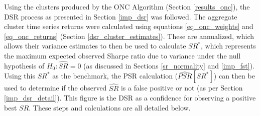 \documentclass[a4paper,11pt,oneside]{article}
\theoremstyle{plain}
\theoremstyle{definition}
\begin{document}
	Using the clusters produced by the ONC Algorithm (Section \ref{results_onc}), the DSR process as presented in Section \ref{imp_dsr} was followed. The aggregate cluster time series returns were calculated using equations \ref{eq_onc_weights} and \ref{eq_onc_returns} (Section \ref{dsr_cluster_estimates}). These are annualized, which allows their variance estimates to then be used to calculate $SR^*$, which represents the maximum expected observed Sharpe ratio due to variance under the null hypothesis of $H_0:  \widehat{SR} = 0$ (as discussed in Sections \ref{sr_normality} and \ref{imp_fst}). Using this $SR^*$ as the benchmark, the PSR calculation ($\widehat{PSR}[SR^*]$) can then be used to determine if the observed $\widehat{SR}$ is a false positive or not (as per Section \ref{imp_dsr_detail}). This figure is the DSR as a confidence for observing a positive best $SR$. These steps and calculations are all detailed below. \newline
	
\end{document}

